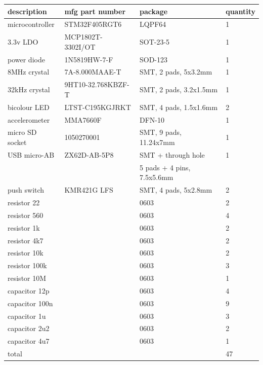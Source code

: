 \documentclass{article}
\begin{document}
\begin{center}
\begin{tabular}{|l|l|l|l|}
\hline

description & mfg part number & package & quantity \\
\hline\hline

microcontroller &
STM32F405RGT6 &
LQPF64 &
1
    
\\ \hline

3.3v LDO &
MCP1802T-3302I/OT &
SOT-23-5 &
1

\\ \hline

power diode &
1N5819HW-7-F &
SOD-123 &
1

\\ \hline

8MHz crystal &
7A-8.000MAAE-T &
SMT, 2 pads, 5x3.2mm &
1

\\ \hline

32kHz crystal &
9HT10-32.768KBZF-T &
SMT, 2 pads, 3.2x1.5mm &
1

\\ \hline

bicolour LED &
LTST-C195KGJRKT &
SMT, 4 pads, 1.5x1.6mm &
2

\\ \hline

accelerometer &
MMA7660F &
DFN-10 &
1

\\ \hline

micro SD socket &
1050270001 &
SMT, 9 pads, 11.24x7mm &
1

\\ \hline

USB micro-AB &
ZX62D-AB-5P8 &
SMT + through hole &
1  \\
&& 5 pads + 4 pins, 7.5x5.6mm  &

\\ \hline

push switch &
KMR421G LFS &
SMT, 4 pads, 5x2.8mm &
2

\\ \hline

resistor 22 & & 0603 & 2 \\
resistor 560 & & 0603 & 4 \\
resistor 1k & & 0603 & 2 \\
resistor 4k7 & & 0603 & 2 \\
resistor 10k & & 0603 & 2 \\
resistor 100k & & 0603 & 3 \\
resistor 10M & & 0603 & 1

\\ \hline

capacitor 12p & & 0603 & 4 \\
capacitor 100n & & 0603 & 9 \\
capacitor 1u & & 0603 & 3 \\
capacitor 2u2 & & 0603 & 2 \\
capacitor 4u7 & & 0603 & 1

\\ \hline\hline

total & & & 47 \\

\hline
\end{tabular}
\end{center}
\end{document}
